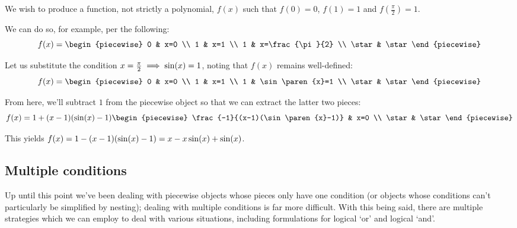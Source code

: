 \begin{example}
    We wish to produce a function, not strictly a polynomial, $f(x)$ such that $f(0)=0$, $f(1)=1$ and $f(\frac{\pi}{2})=1$.

    We can do so, for example, per the following:
    $$
        f(x) = \begin{piecewise}
            0 & x=0 \\
            1 & x=1 \\
            1 & x=\frac{\pi}{2} \\
            \star & \star
        \end{piecewise}
    $$

    Let us substitute the condition $x=\frac{\pi}{2}\implies \sin(x)=1$, noting that $f(x)$ remains well-defined:
    $$
        f(x) = \begin{piecewise}
            0 & x=0 \\
            1 & x=1 \\
            1 & \sin\paren{x}=1 \\
            \star & \star
        \end{piecewise}
    $$

    From here, we'll subtract $1$ from the piecewise object so that we can extract the latter two pieces:
    $$
        f(x) = 1+(x-1)(\sin\paren{x}-1)\begin{piecewise}
            \frac{-1}{(x-1)(\sin\paren{x}-1)} & x=0 \\
            \star & \star
        \end{piecewise}
    $$

    This yields $f(x)=1-(x-1)(\sin(x)-1)=x-x\sin(x)+\sin(x)$.
\end{example}
\subsection{Multiple conditions}
Up until this point we've been dealing with piecewise objects whose pieces only have one condition (or objects whose conditions can't particularly be simplified by nesting); dealing with multiple conditions is far more difficult. With this being said, there are multiple strategies which we can employ to deal with various situations, including formulations for logical `or' and logical `and'.

